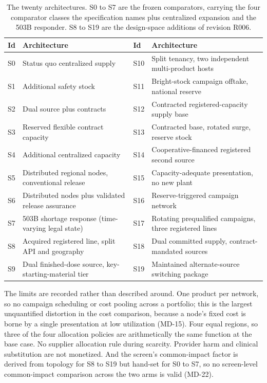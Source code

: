 \begin{table}[htbp]
\centering
\caption{The twenty architectures. S0 to S7 are the frozen comparators, carrying the four
comparator classes the specification names plus centralized expansion and the 503B responder.
S8 to S19 are the design-space additions of revision R006.}
\label{tab:architectures}
\scriptsize
\setlength{\tabcolsep}{4pt}
\begin{tabular}{@{}lp{60mm}lp{48mm}@{}}
\toprule
Id & Architecture & Id & Architecture \\
\midrule
S0 & Status quo centralized supply & S10 & Split tenancy, two independent multi-product hosts \\
S1 & Additional safety stock & S11 & Bright-stock campaign offtake, national reserve \\
S2 & Dual source plus contracts & S12 & Contracted registered-capacity supply base \\
S3 & Reserved flexible contract capacity & S13 & Contracted base, rotated surge, reserve stock \\
S4 & Additional centralized capacity & S14 & Cooperative-financed registered second source \\
S5 & Distributed regional nodes, conventional release & S15 & Capacity-adequate presentation, no new plant \\
S6 & Distributed nodes plus validated release assurance & S16 & Reserve-triggered campaign network \\
S7 & 503B shortage response (time-varying legal state) & S17 & Rotating prequalified campaigns, three registered lines \\
S8 & Acquired registered line, split API and geography & S18 & Dual committed supply, contract-mandated sources \\
S9 & Dual finished-dose source, key-starting-material tier & S19 & Maintained alternate-source switching package \\
\bottomrule
\end{tabular}
\end{table}

The limits are recorded rather than described around. One product per network, so no campaign
scheduling or cost pooling across a portfolio; this is the largest unquantified distortion in
the cost comparison, because a node's fixed cost is borne by a single presentation at low
utilization (MD-15). Four equal regions, so three of the four allocation policies are
arithmetically the same function at the base case. No supplier allocation rule during scarcity.
Provider harm and clinical substitution are not monetized. And the screen's common-impact factor
is derived from topology for S8 to S19 but hand-set for S0 to S7, so no screen-level
common-impact comparison across the two arms is valid (MD-22).
